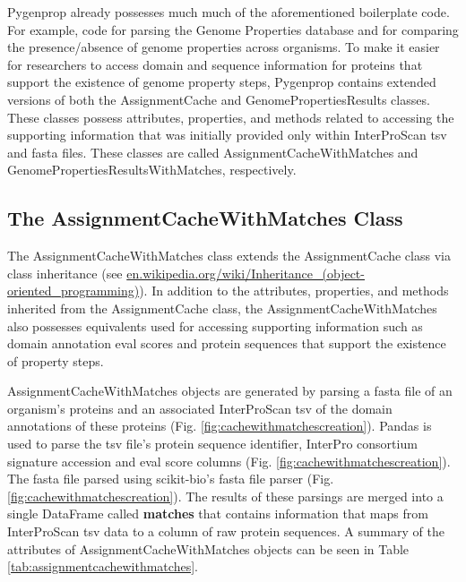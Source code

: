 Pygenprop already possesses much much of the aforementioned boilerplate code. 
For example, code for parsing the Genome Properties database and for comparing 
the presence/absence of genome properties across organisms. To make it easier 
for researchers to access domain and sequence information for proteins that 
support the existence of genome property steps, Pygenprop contains extended 
versions of both the AssignmentCache and GenomePropertiesResults classes. These 
classes possess attributes, properties, and methods related to accessing the 
supporting information that was initially provided only within InterProScan 
\gls{tsv} and \gls{fasta} files. These classes are called AssignmentCacheWithMatches 
and GenomePropertiesResultsWithMatches, respectively.

\subsection{The AssignmentCacheWithMatches Class}

The AssignmentCacheWithMatches class extends the AssignmentCache class via class 
inheritance \cite{snyder1986encapsulation} (see 
\href{http://en.wikipedia.org/wiki/Inheritance_(object-oriented_programming)}{en.wikipedia.org/wiki/Inheritance\_(object-oriented\_programming)}). 
In addition to the attributes, properties, and methods inherited from the 
AssignmentCache class, the AssignmentCacheWithMatches also possesses equivalents 
used for accessing supporting information such as domain annotation \gls{eval} 
scores and protein sequences that support the existence of property steps.

AssignmentCacheWithMatches objects are generated by parsing a \gls{fasta} file 
\cite{pearson19905} of an organism's proteins and an associated InterProScan 
\gls{tsv} of the domain annotations of these proteins (Fig. 
\ref{fig:cachewithmatchescreation}). Pandas is used to parse the \gls{tsv} 
file's protein sequence identifier, InterPro consortium signature accession and 
\gls{eval} score columns (Fig. \ref{fig:cachewithmatchescreation}). The \gls{fasta} 
file parsed using \gls{scikit}-bio's \gls{fasta} file parser (Fig. 
\ref{fig:cachewithmatchescreation})\cite{scikitbio}. The results of these 
parsings are merged into a single DataFrame called \textbf{matches} that 
contains information that maps from InterProScan \gls{tsv} data to a column of 
raw protein sequences. A summary of the attributes of AssignmentCacheWithMatches 
objects can be seen in Table \ref{tab:assignmentcachewithmatches}.

